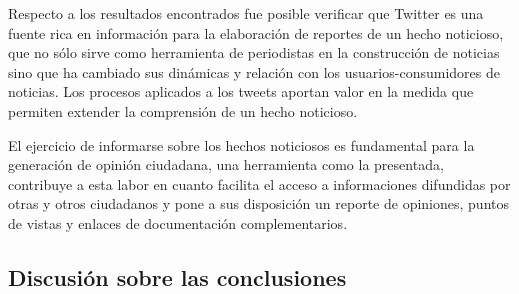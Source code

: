 Respecto a los resultados encontrados fue posible verificar que Twitter es una fuente rica en información para la elaboración de reportes de un hecho noticioso, que no sólo sirve como herramienta de periodistas en la construcción de noticias sino que ha cambiado sus dinámicas y relación con los usuarios-consumidores de noticias. Los procesos aplicados a los tweets aportan valor en la medida que permiten extender la comprensión de un hecho noticioso.

El ejercicio de informarse sobre los hechos noticiosos es fundamental para la generación de opinión ciudadana, una herramienta como la presentada, contribuye a esta labor en cuanto facilita el acceso a informaciones difundidas por otras y otros ciudadanos y pone a sus disposición un reporte de opiniones, puntos de vistas y enlaces de documentación complementarios. 


\subsection{Discusión sobre las conclusiones}

